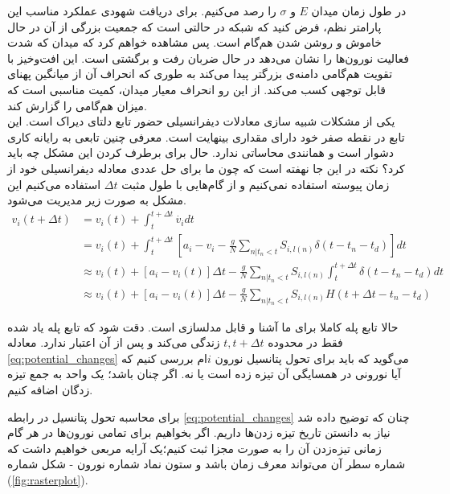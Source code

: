 در طول زمان میدان $E$ و $\sigma$ را رصد می‌کنیم. برای دریافت شهودی عملکرد مناسب این پارامتر نظم، فرض کنید که شبکه در حالتی است که جمعیت بزرگی از آن در حال خاموش و روشن شدن هم‌گام است. پس مشاهده خواهم کرد که میدان که شدت فعالیت نورون‌ها را نشان می‌دهد در حال ضربان رفت و برگشتی است. این افت‌وخیز با تقویت هم‌گامی دامنه‌ی بزرگتر پیدا می‌کند به طوری که انحراف آن از میانگین پهنای قابل توجهی کسب می‌کند. از این رو انحراف معیار میدان، کمیت مناسبی است که میزان هم‌گامی را گزارش کند.\\

یکی از مشکلات شبیه سازی معادلات دیفرانسیلی حضور تابع دلتای دیراک است. این تابع در نقطه صفر خود دارای مقداری بینهایت است. معرفی چنین تابعی به رایانه کاری دشوار است و همانندی محاساتی ندارد. حال برای برطرف کردن این مشکل چه باید کرد؟ نکته در این جا نهفته است که چون ما برای حل عددی معادله دیفرانسیلی خود از زمان پیوسته استفاده نمی‌کنیم و از گام‌هایی با طول مثبت $\Delta t$ استفاده می‌کنیم این مشکل به صورت زیر مدیریت می‌شود.
\begin{align}
	v_{i}(t+\Delta t) &= v_{i}(t) + \int_{t}^{t+\Delta t} \dot{v_i}  dt \\
	&= v_{i}(t) + \int_{t}^{t+\Delta t} \left[ a_i - v_i - \frac{g}{N} \sum_{n|t_n<t} S_{i,l(n)} \delta(t - t_n - t_d)  \right]   dt \\
	&\approx v_{i}(t) +  \left[ a_i - v_i(t) \right] \Delta t - \frac{g}{N} \sum_{n|t_n<t} S_{i,l(n)} \int_{t}^{t+\Delta t} \delta(t - t_n - t_d) dt  \\
	&\approx v_{i}(t) +  \left[ a_i - v_i(t) \right] \Delta t - \frac{g}{N} \sum_{n|t_n<t} S_{i,l(n)} H(t + \Delta t- t_n - t_d) \label{eq:potential_changes}
\end{align}

حالا تابع پله کاملا برای ما آشنا و قابل مدلسازی است. دقت شود که تابع پله یاد شده فقط در محدوده $t, t+\Delta t$ زندگی می‌کند و پس از آن اعتبار ندارد. معادله \ref{eq:potential_changes}  می‌گوید که باید برای تحول پتانسیل نورون $i$ام بررسی کنیم که آیا نورونی در همسایگی آن تیزه زده است یا نه. اگر چنان باشد؛ یک واحد به جمع تیزه زدگان اضافه کنیم.


برای محاسبه تحول پتانسیل در رابطه \ref{eq:potential_changes} چنان که توضیح داده شد نیاز به دانستن تاریخ تیزه زدن‌ها داریم. اگر بخواهیم برای تمامی نورون‌ها در هر گام زمانی تیزه‌زدن آن را به صورت مجزا ثبت کنیم؛یک آرایه مربعی خواهیم داشت که شماره سطر آن می‌تواند معرف زمان باشد و ستون نماد شماره نورون - شکل شماره (\ref{fig:rasterplot}).\\

